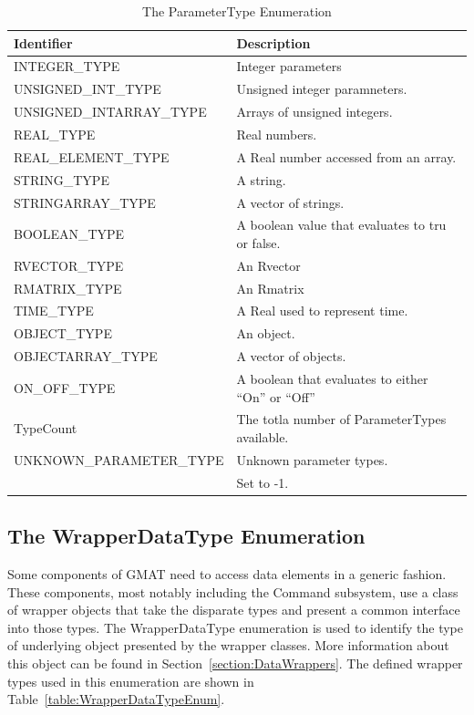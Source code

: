 \begin{table}[htb]
\begin{center}
\caption{\label{table:ParameterTypeEnum}The ParameterType Enumeration}
\setlength\extrarowheight{2pt}
\begin{tabular}{|p{2.5in}|p{3.2in}|}
\hline
Identifier & Description \\
\hline
\hline
INTEGER\_TYPE & Integer parameters \\
UNSIGNED\_INT\_TYPE & Unsigned integer paramneters.\\
UNSIGNED\_INTARRAY\_TYPE & Arrays of unsigned integers.\\
REAL\_TYPE & Real numbers.\\
REAL\_ELEMENT\_TYPE & A Real number accessed from an array.\\
STRING\_TYPE & A string.\\
STRINGARRAY\_TYPE & A vector of strings.\\
BOOLEAN\_TYPE & A boolean value that evaluates to tru or false.\\
RVECTOR\_TYPE & An Rvector\\
RMATRIX\_TYPE & An Rmatrix\\
TIME\_TYPE & A Real used to represent time.\\
OBJECT\_TYPE & An object.\\
OBJECTARRAY\_TYPE & A vector of objects.\\
ON\_OFF\_TYPE & A boolean that evaluates to either ``On'' or ``Off''\\
TypeCount & The totla number of ParameterTypes available. \\
UNKNOWN\_PARAMETER\_TYPE & Unknown parameter types.\\
& Set to -1. \\
\hline
\end{tabular}
\end{center}
\end{table}


\subsection{\label{section:WrapperDataTypeEnum}The WrapperDataType Enumeration}

Some components of GMAT need to access data elements in a generic fashion.  These components, most
notably including the Command subsystem, use a class of wrapper objects that take the disparate
types and present a common interface into those types.  The WrapperDataType enumeration is used to
identify the type of underlying object presented by the wrapper classes.  More information about
this object can be found in Section~\ref{section:DataWrappers}.  The defined wrapper types used in
this enumeration are shown in Table~\ref{table:WrapperDataTypeEnum}.

